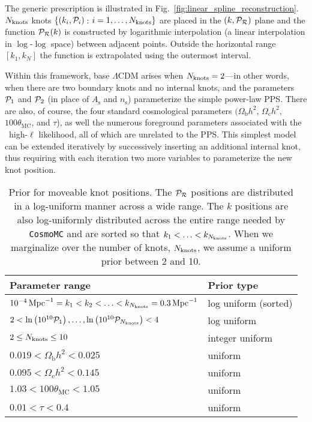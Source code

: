 The generic prescription is illustrated in Fig.~\ref{fig:linear_spline_reconstruction}. $N_\mathrm{knots}$ knots
$\{(k_i,\mathcal{P}_{i})\,$: $i=1,\ldots,N_\mathrm{knots}\}$ are placed in the $(k,\mathcal{P}_\mathcal{R})$ plane and the function $\mathcal{P}_\mathcal{R}(k)$ is
constructed by logarithmic interpolation (a linear interpolation in $\log$-$\log$ space) between adjacent points.
Outside the horizontal range $[k_1,k_N]$ the function is extrapolated using the outermost interval.

Within this framework, base $\Lambda$CDM arises when ${N_\mathrm{knots}=2}$---in other words, when there are two boundary knots
and no internal knots, and the parameters $\mathcal{P}_{1}$ and $\mathcal{P}_{2}$ (in place of $A_\mathrm{s}$ and $n_\mathrm{s}$) parameterize
the simple power-law PPS. There are also, of course,
the four standard cosmological parameters $(\Omega_{\mathrm{b}} h^2$, $\Omega_{\mathrm{c}} h^2$, $100\theta_{\mathrm{MC}}$, and 
$\tau$), as well the numerous foreground parameters associated with the \Planck\ high-$\ell$ likelihood, all of which are unrelated to the PPS.
This simplest model can be extended iteratively by successively inserting an additional internal knot, thus requiring with each iteration
two more variables to parameterize the new knot position.


\begin{table}
  \begin{tabular}{ll}
      Parameter range &
      Prior type
      \\
      \hline
      $10^{-4}\,\mathrm{Mpc}^{-1} = k_1< k_2 < \ldots < k_{N_\mathrm{knots}} = 0.3\,\mathrm{Mpc}^{-1}$ &
      log uniform (sorted)
      \\
      $ 2 < \ln\left(10^{10}\mathcal{P}_{1}\right), \ldots ,\ln\left(10^{10}\mathcal{P}_{{N_\mathrm{knots}}}\right) < 4 $  &
      log uniform
      \\
      $2\le N_\mathrm{knots} \le 10 $ &
      integer uniform
      \\
      \hline
      $0.019< \Omega_\mathrm{b} h^2 <0.025$ &
      uniform
      \\
      $0.095< \Omega_\mathrm{c} h^2 <0.145$ &
      uniform
      \\
      $1.03< 100\theta_\mathrm{MC} <1.05$ &
      uniform
      \\
      $0.01< \tau< 0.4$ &
      uniform
      \\
      \hline
    \end{tabular}
\caption{%
Prior for moveable knot positions.
The $\mathcal{P}_\mathcal{R}$ positions are distributed in a log-uniform manner across a wide range.
The $k$ positions are also log-uniformly distributed
across the entire range needed by {\tt CosmoMC} and are sorted so that ${k_1<\ldots<k_{N_\mathrm{knots}}}$. 
When we marginalize over the number of knots, $N_\mathrm{knots}$, we assume a uniform prior between 2 and 10. 
  \label{tab:P_k_priors}  }                          %
\end{table}                        %

